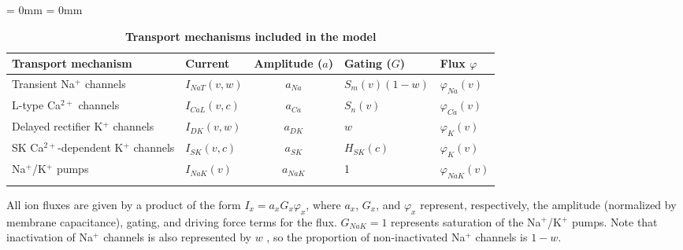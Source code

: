\documentclass[10pt,letterpaper]{article}
\newcommand{\Ca}{Ca$^{2+}$}
\newcommand{\K}{K$^{+}$}
\newcommand{\Na}{Na$^{+}$}
\newcommand{\midsepremove}{\aboverulesep = 0mm \belowrulesep = 0mm}
\begin{document}
\begin{footnotesize}
\begin{table}[ht!]
\begin{adjustwidth}{-0.4in}{0in} %
{}
\midsepremove
\caption{\centering \textbf{Transport mechanisms included in the model}}
\begin{tabular}{l l c l l}
\toprule
\rowcolor{white}
Transport mechanism & Current & Amplitude ($a$)& Gating ($G$) & Flux $\varphi$ \\
\toprule
Transient {\Na} channels & $I_{NaT}(v,w)$ & $a_{Na}$ & $S_m(v) (1-w)$ & $\varphi_{Na}(v)$ \\
L-type {\Ca} channels & $I_{CaL}(v,c)$ & $a_{Ca}$ & $S_{n}(v)$ & $ \varphi_{Ca}(v)$  \\ 
Delayed rectifier {\K} channels& $I_{DK}(v,w)$ & $a_{DK}$ & $w$ & $\varphi_K(v)$  \\ 
SK {\Ca}-dependent {\K} channels& $I_{SK}(v,c)$ & $a_{SK}$& $ H_{SK}(c)$ & $ \varphi_K(v)$  
\\ 
{\Na}/{\K} pumps & $I_{NaK}(v)$ & $a_{NaK}$& 1 & $\varphi_{NaK}(v)$ \\ 
\bottomrule
\rowcolor{white}
\end{tabular}
\label{tab:ionFluxes}
\begin{flushleft}
\footnotesize{All ion fluxes are given by a product of the form $I_x = a_x G_x \varphi_x$, where $a_x$, $G_x$, and $\varphi_x$ represent, respectively, the amplitude (normalized by membrane capacitance), gating, and driving force terms for the flux. $G_{NaK}=1$ represents saturation of the {\Na}/{\K} pumps. Note that inactivation of {\Na} channels is also represented by $w$ \cite{rinzel1985excitation,avron1991minimal}, so the proportion of non-inactivated {\Na} channels is $1-w$.}
\end{flushleft}
\end{adjustwidth}
\end{table}
\end{footnotesize}
\end{document}
